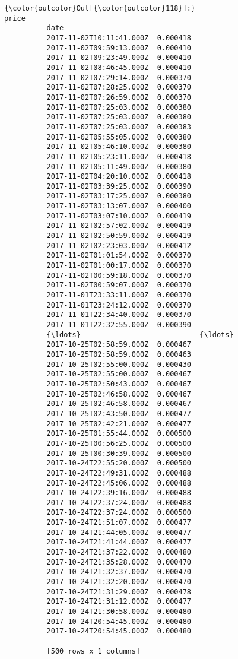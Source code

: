 \documentclass[11pt]{article}
\begin{document}
\begin{Verbatim}[commandchars=\\\{\}]
{\color{outcolor}Out[{\color{outcolor}118}]:}                              price
          date                              
          2017-11-02T10:11:41.000Z  0.000418
          2017-11-02T09:59:13.000Z  0.000410
          2017-11-02T09:23:49.000Z  0.000410
          2017-11-02T08:46:45.000Z  0.000410
          2017-11-02T07:29:14.000Z  0.000370
          2017-11-02T07:28:25.000Z  0.000370
          2017-11-02T07:26:59.000Z  0.000370
          2017-11-02T07:25:03.000Z  0.000380
          2017-11-02T07:25:03.000Z  0.000380
          2017-11-02T07:25:03.000Z  0.000383
          2017-11-02T05:55:05.000Z  0.000380
          2017-11-02T05:46:10.000Z  0.000380
          2017-11-02T05:23:11.000Z  0.000418
          2017-11-02T05:11:49.000Z  0.000380
          2017-11-02T04:20:10.000Z  0.000418
          2017-11-02T03:39:25.000Z  0.000390
          2017-11-02T03:17:25.000Z  0.000380
          2017-11-02T03:13:07.000Z  0.000400
          2017-11-02T03:07:10.000Z  0.000419
          2017-11-02T02:57:02.000Z  0.000419
          2017-11-02T02:50:59.000Z  0.000419
          2017-11-02T02:23:03.000Z  0.000412
          2017-11-02T01:01:54.000Z  0.000370
          2017-11-02T01:00:17.000Z  0.000370
          2017-11-02T00:59:18.000Z  0.000370
          2017-11-02T00:59:07.000Z  0.000370
          2017-11-01T23:33:11.000Z  0.000370
          2017-11-01T23:24:12.000Z  0.000370
          2017-11-01T22:34:40.000Z  0.000370
          2017-11-01T22:32:55.000Z  0.000390
          {\ldots}                            {\ldots}
          2017-10-25T02:58:59.000Z  0.000467
          2017-10-25T02:58:59.000Z  0.000463
          2017-10-25T02:55:00.000Z  0.000430
          2017-10-25T02:55:00.000Z  0.000467
          2017-10-25T02:50:43.000Z  0.000467
          2017-10-25T02:46:58.000Z  0.000467
          2017-10-25T02:46:58.000Z  0.000467
          2017-10-25T02:43:50.000Z  0.000477
          2017-10-25T02:42:21.000Z  0.000477
          2017-10-25T01:55:44.000Z  0.000500
          2017-10-25T00:56:25.000Z  0.000500
          2017-10-25T00:30:39.000Z  0.000500
          2017-10-24T22:55:20.000Z  0.000500
          2017-10-24T22:49:31.000Z  0.000488
          2017-10-24T22:45:06.000Z  0.000488
          2017-10-24T22:39:16.000Z  0.000488
          2017-10-24T22:37:24.000Z  0.000488
          2017-10-24T22:37:24.000Z  0.000500
          2017-10-24T21:51:07.000Z  0.000477
          2017-10-24T21:44:05.000Z  0.000477
          2017-10-24T21:41:44.000Z  0.000477
          2017-10-24T21:37:22.000Z  0.000480
          2017-10-24T21:35:28.000Z  0.000470
          2017-10-24T21:32:37.000Z  0.000470
          2017-10-24T21:32:20.000Z  0.000470
          2017-10-24T21:31:29.000Z  0.000478
          2017-10-24T21:31:12.000Z  0.000477
          2017-10-24T21:30:58.000Z  0.000480
          2017-10-24T20:54:45.000Z  0.000480
          2017-10-24T20:54:45.000Z  0.000480
          
          [500 rows x 1 columns]
\end{Verbatim}
            
\end{document}
